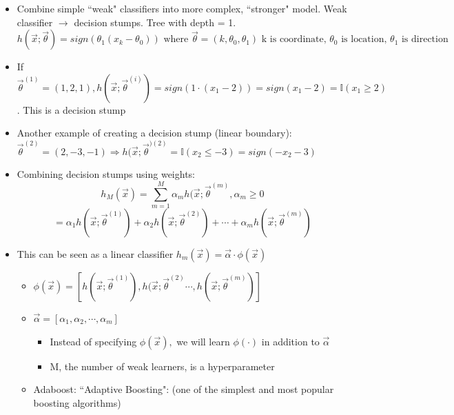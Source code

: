\documentclass[10pt, oneside]{article}
\begin{document}
\begin{itemize}
    \item Combine simple ``weak" classifiers into more complex, ``stronger" model. Weak classifier $\rightarrow$ decision stumps. Tree with depth = 1.
    \[h(\vec x; \vec \theta) = sign(\theta_1 (x_k - \theta_0)) \text{ where } \vec \theta = (k, \theta_0, \theta_1) \text{ k is coordinate, $\theta_0$ is location, $\theta_1$ is direction}\]
    \item If $\vec \theta ^{(1)} = (1,2,1), h(\vec x; \vec \theta^{(i)}) = sign(1 \cdot (x_1 - 2)) = sign(x_1 - 2) = \mathbb{I}(x_1 \geq 2)$. This is a decision stump
    \item Another example of creating a decision stump (linear boundary): $\vec \theta ^{(2)} = (2,-3,-1) \Rightarrow h(\vec x; \vec \theta^{)(2)} = \mathbb{I} (x_2 \leq -3) = sign(-x_2 - 3)$
    \item Combining decision stumps using weights: \[h_M (\vec x) = \sum_{m=1}^M \alpha_m h(\vec x; \vec \theta ^{(m)}, \alpha_m \geq 0\]\[= \alpha_1 h(\vec x; \vec \theta ^{(1)}) + \alpha_2 h(\vec x; \vec \theta^{(2)} ) + \cdots + \alpha_m h(\vec x ; \vec \theta^ {(m)})\]
    \item This can be seen as a linear classifier $h_m(\vec x) = \vec \alpha \cdot \phi(\vec x)$
    \begin{itemize}
        \item $\phi(\vec x) = [h(\vec x; \vec \theta^{(1)}), h(\vec x; \vec \theta^{(2)} \cdots, h(\vec x; \vec \theta^{(m)})]$
        \item $\vec \alpha = [\alpha_1, \alpha_2, \cdots, \alpha_m]$
        \begin{itemize}
            \item Instead of specifying $\phi(\vec x),$ we will learn $\phi(\cdot)$ in addition to $\vec \alpha$
            \item M, the number of weak learners, is a hyperparameter
        \end{itemize}
        \item Adaboost: ``Adaptive Boosting": (one of the simplest and most popular boosting algorithms)
    \end{itemize}
\end{itemize}
\end{document}
